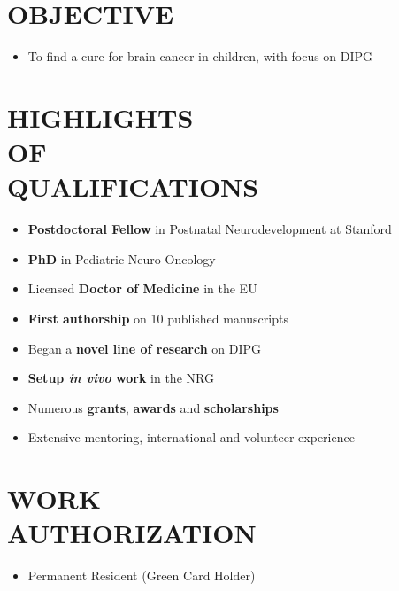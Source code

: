 \documentclass[line,margin]{res}
\begin{document}
\begin{resume}

\section{OBJECTIVE}
\begin{itemize}
\item {\small To find a cure for brain cancer in children, with focus on DIPG}
\end{itemize}

\section{HIGHLIGHTS \\ OF \\ QUALIFICATIONS}
\begin{itemize}
  \item {\small {\bf Postdoctoral Fellow} in Postnatal Neurodevelopment at Stanford}
  \item {\small {\bf PhD} in Pediatric Neuro-Oncology}
  \item {\small Licensed {\bf Doctor of Medicine} in the EU}
  \item {\small {\bf First authorship} on 10 published manuscripts}
  \item {\small Began a {\bf novel line of research} on DIPG}
  \item {\small {\bf Setup \emph{in vivo} work} in the NRG}
  \item {\small Numerous {\bf grants}, {\bf awards} and {\bf scholarships}}
  \item {\small Extensive mentoring, international and volunteer experience}
\end{itemize}

\section{WORK \\ AUTHORIZATION}
\begin{itemize}
\item Permanent Resident (Green Card Holder)
\end{itemize}

\vspace{15pt}

\end{resume}
\end{document}
